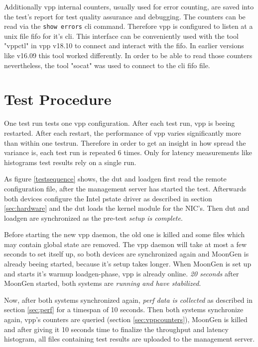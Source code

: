 Additionally \Ac{vpp} internal counters, usually used for error
counting, are saved into the test's report for test quality assurance
and debugging. The counters can be read via the \lstinline|show
errors|  \Ac{cli} command. Therefore \Ac{vpp} is configured to listen
at a unix file fifo for it's \Ac{cli}. This interface can be
conveniently used with the tool "vppctl" in \Ac{vpp} v18.10 to connect
and interact with the fifo. In earlier versions like v16.09 this tool
worked differently. In order to be able to read those counters
nevertheless, the tool "socat" was used to connect to the \Ac{cli}
fifo file.


\section{Test Procedure}

One test run tests one \Ac{vpp} configuration. After each test run,
\Ac{vpp} is beeing restarted. After each restart, the performance of
\Ac{vpp} varies significantly more than within one testrun. Therefore
in order to get an insight in how spread the variance is, each test
run is repeated 6 times. Only for latency measurements like histograms
test results rely on a single run.

As figure \ref{testsequence} shows, the \Ac{dut} and \Ac{loadgen}
first read the remote configuration file, after the management server
has started the test. Afterwards both devices configure the Intel
pstate driver  as described in section \ref{sec:hardware} and the
\Ac{dut} loads the kernel module for the NIC's. Then \Ac{dut} and
\Ac{loadgen} are synchronized as the pre-test \textit{setup is
complete}.

Before starting the new \Ac{vpp} daemon, the old one is killed and
some files which may contain global state are removed. The \Ac{vpp}
daemon will take at most a few seconds to set itself up, so both
devices are synchronized again and MoonGen is already beeing started,
because it's setup takes longer. When MoonGen is set up and starts
it's warmup loadgen-phase, \Ac{vpp} is already online. \textit{20
seconds} after MoonGen started, both systems are \textit{running and
have stabilized}.

Now, after both systems synchronized again, \textit{\Ac{perf} data is
collected} as described in section \ref{sec:perf} for a timespan of 10
seconds. Then both systems synchronize again, \Ac{vpp}'s counters are
queried (section \ref{sec:vppcounters}), MoonGen is killed and after
giving it 10 seconds time to finalize the throughput and latency
histogram, all files containing test results are uploaded to the
management server.

